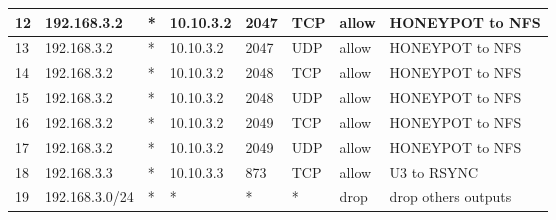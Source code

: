 \documentclass[a4paper, 11pt, oneside]{article}
\begin{document}
\begin{table}[H]
\begin{tabular}{|llllllll|}
  \multicolumn{1}{|l|}{12}          & \multicolumn{1}{l|}{192.168.3.2}     & \multicolumn{1}{l|}{*}           & \multicolumn{1}{l|}{10.10.3.2}            & \multicolumn{1}{l|}{2047}        & \multicolumn{1}{l|}{TCP}               & \multicolumn{1}{l|}{allow}           & HONEYPOT to NFS     \\ \hline
  \multicolumn{1}{|l|}{13}          & \multicolumn{1}{l|}{192.168.3.2}     & \multicolumn{1}{l|}{*}           & \multicolumn{1}{l|}{10.10.3.2}            & \multicolumn{1}{l|}{2047}        & \multicolumn{1}{l|}{UDP}               & \multicolumn{1}{l|}{allow}           & HONEYPOT to NFS     \\ \hline
  \multicolumn{1}{|l|}{14}          & \multicolumn{1}{l|}{192.168.3.2}     & \multicolumn{1}{l|}{*}           & \multicolumn{1}{l|}{10.10.3.2}            & \multicolumn{1}{l|}{2048}        & \multicolumn{1}{l|}{TCP}               & \multicolumn{1}{l|}{allow}           & HONEYPOT to NFS     \\ \hline
  \multicolumn{1}{|l|}{15}          & \multicolumn{1}{l|}{192.168.3.2}     & \multicolumn{1}{l|}{*}           & \multicolumn{1}{l|}{10.10.3.2}            & \multicolumn{1}{l|}{2048}        & \multicolumn{1}{l|}{UDP}               & \multicolumn{1}{l|}{allow}           & HONEYPOT to NFS     \\ \hline
  \multicolumn{1}{|l|}{16}          & \multicolumn{1}{l|}{192.168.3.2}     & \multicolumn{1}{l|}{*}           & \multicolumn{1}{l|}{10.10.3.2}            & \multicolumn{1}{l|}{2049}        & \multicolumn{1}{l|}{TCP}               & \multicolumn{1}{l|}{allow}           & HONEYPOT to NFS     \\ \hline
  \multicolumn{1}{|l|}{17}          & \multicolumn{1}{l|}{192.168.3.2}     & \multicolumn{1}{l|}{*}           & \multicolumn{1}{l|}{10.10.3.2}            & \multicolumn{1}{l|}{2049}        & \multicolumn{1}{l|}{UDP}               & \multicolumn{1}{l|}{allow}           & HONEYPOT to NFS     \\ \hline
  \multicolumn{1}{|l|}{18}          & \multicolumn{1}{l|}{192.168.3.3}     & \multicolumn{1}{l|}{*}           & \multicolumn{1}{l|}{10.10.3.3}            & \multicolumn{1}{l|}{873}         & \multicolumn{1}{l|}{TCP}               & \multicolumn{1}{l|}{allow}           & U3 to RSYNC         \\ \hline
  \multicolumn{1}{|l|}{19}          & \multicolumn{1}{l|}{192.168.3.0/24}  & \multicolumn{1}{l|}{*}           & \multicolumn{1}{l|}{*}                    & \multicolumn{1}{l|}{*}           & \multicolumn{1}{l|}{*}                 & \multicolumn{1}{l|}{drop}            & drop others outputs \\ \hline

\end{tabular}
\end{table}
\end{document}

